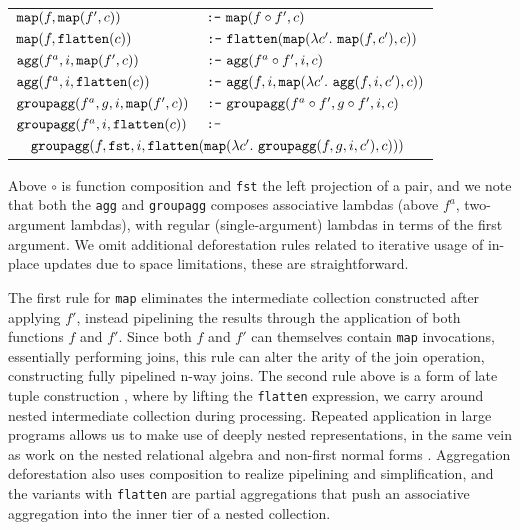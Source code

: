 \vspace{1mm}\hspace{-6mm}
\begin{tabular}{p{3.6cm}l}
$\mbox{\texttt{map}}(f, \mbox{\texttt{map}}(f', c))$ 
    & $\mbox{\texttt{:-}}\ \mbox{\texttt{map}}(f \circ f', c)$
\\
$\mbox{\texttt{map}}(f, \mbox{\texttt{flatten}}(c))$
    & $\xform\ \flatten(\map(\lambda c'.\ \map(f,c'), c))$
\\
$\mbox{\texttt{agg}}(f^a, i, \mbox{\texttt{map}}(f', c))$
    & $\xform\ \agg(f^a \circ f', i, c)$
\\
$\mbox{\texttt{agg}}(f^a, i, \mbox{\texttt{flatten}}(c))$
    & $\mbox{\texttt{:-}}\ \mbox{\texttt{agg}}(f, i, \mbox{\texttt{map}}(\lambda c'.\ \mbox{\texttt{agg}}(f, i, c'),c))$
\\
$\mbox{\texttt{groupagg}}(f^a, g, i, \mbox{\texttt{map}}(f', c))$
    & $\xform\ \groupagg(f^a \circ f', g \circ f', i, c)$
\\
$\mbox{\texttt{groupagg}}(f^a, i, \mbox{\texttt{flatten}}(c))$ & $\mbox{\texttt{:-}}$
\\
\multicolumn{2}{l}{
$\quad\mbox{\texttt{groupagg}}(f, \mbox{\texttt{fst}}, i, \mbox{\texttt{flatten}}(
    \mbox{\texttt{map}}(\lambda c'.\ \mbox{\texttt{groupagg}}(f, g, i, c'),c)))$}
\end{tabular}


\vspace{1mm}
Above $\circ$ is function composition and \texttt{fst} the left projection of a
pair, and we note that both the \texttt{agg} and \texttt{groupagg} composes
associative lambdas (above $f^a$, two-argument lambdas), with regular
(single-argument) lambdas in terms of the first argument. We omit additional
deforestation rules related to iterative usage of in-place updates due to space
limitations, these are straightforward.

The first rule for \texttt{map} eliminates the intermediate collection
constructed after applying $f'$, instead pipelining the results through the
application of both functions $f$ and $f'$. Since both $f$ and $f'$ can
themselves contain \texttt{map} invocations, essentially performing joins, this
rule can alter the arity of the join operation, constructing fully pipelined
n-way joins. The second rule above is a form of late tuple construction
, where by lifting the \texttt{flatten} expression, we carry around
nested intermediate collection during processing. Repeated application in large
programs allows us to make use of deeply nested representations, in the same
vein as work on the nested relational algebra and non-first normal forms
. Aggregation deforestation also uses composition to realize
pipelining and simplification, and the variants with \texttt{flatten} are 
partial aggregations that push an associative aggregation into the inner tier of
a nested collection.



